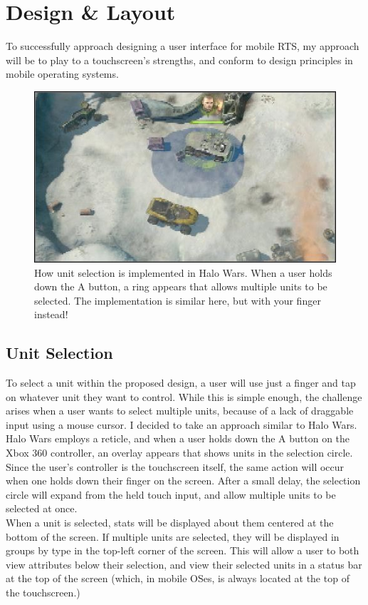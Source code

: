 \documentclass[11pt]{article}
\begin{document}
\section{Design \& Layout}
To successfully approach designing a user interface for mobile RTS, my approach will be to play to a touchscreen's strengths, and conform to design principles in mobile operating systems.
	\begin{figure}[!ht]
	\begin{center}
	\includegraphics[height = 2.5in]{blue-selection}
	\caption{How unit selection is implemented in Halo Wars. When a user holds down the A button, a ring appears that allows multiple units to be selected. The implementation is similar here, but with your finger instead!}
	\end{center}
	\end{figure}
	\subsection{Unit Selection}
	To select a unit within the proposed design, a user will use just a finger and tap on whatever unit they want to control. While this is simple enough, the challenge arises when a user wants to select multiple units, because of a lack of draggable input using a mouse cursor. I decided to take an approach similar to Halo Wars. Halo Wars employs a reticle, and when a user holds down the A button on the Xbox 360 controller, an overlay appears that shows units in the selection circle. Since the user's controller is the touchscreen itself, the same action will occur when one holds down their finger on the screen. After a small delay, the selection circle will expand from the held touch input, and allow multiple units to be selected at once. \\ %
	\indent When a unit is selected, stats will be displayed about them centered at the bottom of the screen. If multiple units are selected, they will be displayed in groups by type in the top-left corner of the screen. This will allow a user to both view attributes below their selection, and view their selected units in a status bar at the top of the screen (which, in mobile OSes, is always located at the top of the touchscreen.)
\end{document}
